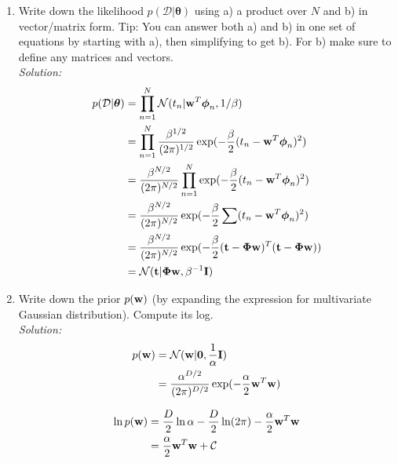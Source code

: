 \documentclass[12pt,a4paper]{article}
\newcommand{\Data}{\mathcal{D}}
\newcommand{\DataIndex}{n}
\newcommand{\eye}{{\bf I}}
\newcommand{\tscalar}{t}
\newcommand{\tvec}{{\bf \tscalar}}
\newcommand{\wscalar}{w}
\newcommand{\wvec}{{\bf \wscalar}}
\newcommand{\tn}{\tscalar_{\DataIndex}}
\newcommand{\zerovec}{ {\bf 0}}
\newcommand{\thetavec}{\boldsymbol{\theta}}
\newcommand{\thetav}{\thetavec}
\newcommand{\phivec}{\boldsymbol{\phi}}
\newcommand{\Phimat}{\boldsymbol{\Phi}}
\newcommand{\phivecn}{\phivec_{\DataIndex}}
\begin{document}
\begin{enumerate}
  \item Write down the likelihood $p(\Data | \thetav)$ using a) a product over $N$ and b) in vector/matrix form.    Tip: You can answer both a) and b) in one set of equations by starting with a), then simplifying to get b).  For b) make sure to define any matrices and vectors. \\
	  \emph{Solution:} \\
		  \begin{align*}
		  p(\Data | \thetav) &= \prod_{n=1}^{N} \mathcal{N}(\tn| \wvec^T \phivecn, 1 / \beta) \\
		  &=  \prod_{n=1}^{N} \frac{\beta^{1/2}}{(2\pi)^{1/2}} \exp (-\frac{\beta}{2}(\tn- \wvec^T \phivecn)^2)\\
		  &=  \frac{\beta^{N/2}}{(2\pi)^{N/2}} \prod_{n=1}^{N} \exp (-\frac{\beta}{2}(\tn- \wvec^T \phivecn)^2)\\    
		  &=  \frac{\beta^{N/2}}{(2\pi)^{N/2}} \exp (-\frac{\beta}{2}\sum(\tn - \wvec^T \phivecn)^2)\\    
		  &=  \frac{\beta^{N/2}}{(2\pi)^{N/2}} \exp (-\frac{\beta}{2}(\tvec - \Phimat \wvec)^T(\tvec - \Phimat \wvec))\\
		  &=\mathcal{N}(\tvec | \Phimat \wvec, \beta^{-1} \eye )
		  \end{align*}
	  
  \item Write down the prior $p(\wvec)$ (by expanding the expression for multivariate Gaussian distribution).  Compute its log.\\
	  \emph{Solution:} \\
		  \begin{align*}
		  p(\wvec) &= \mathcal{N}(\wvec | \zerovec, \frac{1}{\alpha}\eye) \\
		  &= \frac{\alpha^{D/2}}{(2\pi)^{D/2}} \exp (- \frac{\alpha}{2} \wvec^T \wvec)
		  \end{align*}
		  
		  \begin{align*}
		  \ln p(\wvec) &= \frac{D}{2} \ln \alpha - \frac{D}{2} \ln (2 \pi) - \frac{\alpha}{2}\wvec^T \wvec \\
		  &= \frac{\alpha}{2} \wvec^T \wvec + \mathcal{C}
		  \end{align*}  
  

\end{enumerate}
\end{document}
